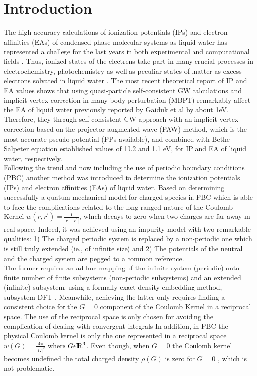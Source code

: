 \documentclass[12pt,a4paper]{article}
\begin{document}
\section{Introduction}

The high-accuracy calculations of ionization potentials (IPs) and electron affinities (EAs) of condensed-phase molecular systems as liquid water has 
represented a challege for the last years in both experimental and computational fields
\cite{tolle2019charged,gaiduk2018electron,gaiduk2016photoelectron,seidel2016valence}. Thus, ionized states of the electrons take part in many
crucial processes in electrochemistry, photochemistry as well as peculiar states of matter as excess electrons solvated in liquid water
\cite{ambrosio2017electronic}. The most recent theoretical report of IP and EA values \cite{ziaei2018probing} shows that using quasi-particle self-consistent GW calculations and implicit vertex correction in many-body perturbation (MBPT) remarkably affect the EA of liquid water previously reported
\cite{gaiduk2018electron} by Gaiduk et al by about 1eV. Therefore, they through self-consistent GW approach with an implicit vertex correction based on the projector augmented wave (PAW) method, which is the most accurate pseudo-potential \cite{dal2014pseudopotentials} (PPs available), and combined with Bethe–Salpeter equation established values of 10.2 and 1.1 eV, for IP and EA of liquid water, respectively. \\

Following the trend and now including the use of periodic boundary conditions (PBC) another method was introduced \cite{tolle2019charged}
to determine the ionization potentials (IPs) and electron affinities (EAs) of liquid water. Based on determining successfully a quatum-mechanical
model for charged species in PBC which is able to face the complications related to the long-ranged nature of the Coulomb Kernel
$ w(r,r^{'}) = \frac {1}{|r - r^{'}|}$, which decays to zero when two charges are far away in real space. Indeed, it was achieved using an impurity model with two remarkable qualities: 1) The charged periodic system is replaced by a non-periodic one which is still truly
extended (ie., of infinite size) and 2) The potentials of the neutral and the charged system are pegged to a common reference. \\

The former requires an ad hoc mapping of the infinite system (periodic) onto finite number of finite subsystems (non-periodic subsystems) and an
extended (infinite) subsystem, using a formally exact density embedding method, subsystem DFT \cite{wesolowski2015frozen}. Meanwhile, achieving
the latter only requires finding a consistent choice for the $G = 0$ component of the Coulomb Kernel in a reciprocal space. 
The use of the reciprocal space is only chosen for avoiding the complication of dealing with convergent integrals \cite{martin2004electronic}
In addition, in PBC the physical Coulomb kernel is only the one represented in a reciprocal space $w(G) = \frac {4\pi}{|G|^2}$ where
$G \epsilon {\rm I\!R}^3$. Even though, when $G=0$ the Coulomb kernel becomes undefined the total charged density $\rho (G)$ is zero for $G = 0$
, which is not problematic.\\
\end{document}
